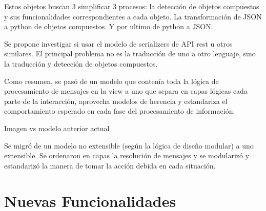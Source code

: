         \par Estos objetos buscan 3 simplificar 3 procesos: la detección de objetos compuestos y sus funcionalidades correspondientes a cada objeto. La transformación de JSON a python de objetos compuestos. Y por ultimo de python a JSON.
        \par Se propone investigar si usar el modelo de serializers de API rest u otros similares. El principal problema no es la traducción de uno a otro lenguaje, sino la traducción y detección de objetos compuestos.

        \par Como resumen, se pasó de un modelo que contenía toda la lógica de procesamiento de mensajes en la view a uno que separa en capas lógicas cada parte de la interacción, aprovecha modelos de herencia y estandariza el comportamiento esperado en cada fase del procesamiento de información.

        Imagen vs modelo anterior actual












    \par Se migró de un modelo no extensible (según la lógica de diseño modular) a uno extensible. Se ordenaron en capas la resolución de mensajes y se modularizó y estandarizó la manera de tomar la acción debida en cada situación.

 \section {Nuevas Funcionalidades}

